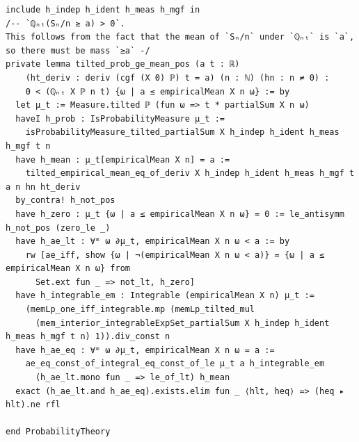\begin{lstlisting}
include h_indep h_ident h_meas h_mgf in
/-- `ℚₙₜ(Sₙ/n ≥ a) > 0`.
This follows from the fact that the mean of `Sₙ/n` under `ℚₙₜ` is `a`, so there must be mass `≥a` -/
private lemma tilted_prob_ge_mean_pos (a t : ℝ)
    (ht_deriv : deriv (cgf (X 0) ℙ) t = a) (n : ℕ) (hn : n ≠ 0) :
    0 < (ℚₙₜ X ℙ n t) {ω | a ≤ empiricalMean X n ω} := by
  let μ_t := Measure.tilted ℙ (fun ω => t * partialSum X n ω)
  haveI h_prob : IsProbabilityMeasure μ_t :=
    isProbabilityMeasure_tilted_partialSum X h_indep h_ident h_meas h_mgf t n
  have h_mean : μ_t[empiricalMean X n] = a :=
    tilted_empirical_mean_eq_of_deriv X h_indep h_ident h_meas h_mgf t a n hn ht_deriv
  by_contra! h_not_pos
  have h_zero : μ_t {ω | a ≤ empiricalMean X n ω} = 0 := le_antisymm h_not_pos (zero_le _)
  have h_ae_lt : ∀ᵐ ω ∂μ_t, empiricalMean X n ω < a := by
    rw [ae_iff, show {ω | ¬(empiricalMean X n ω < a)} = {ω | a ≤ empiricalMean X n ω} from
      Set.ext fun _ => not_lt, h_zero]
  have h_integrable_em : Integrable (empiricalMean X n) μ_t :=
    (memLp_one_iff_integrable.mp (memLp_tilted_mul
      (mem_interior_integrableExpSet_partialSum X h_indep h_ident h_meas h_mgf t n) 1)).div_const n
  have h_ae_eq : ∀ᵐ ω ∂μ_t, empiricalMean X n ω = a :=
    ae_eq_const_of_integral_eq_const_of_le μ_t a h_integrable_em
      (h_ae_lt.mono fun _ => le_of_lt) h_mean
  exact (h_ae_lt.and h_ae_eq).exists.elim fun _ ⟨hlt, heq⟩ => (heq ▸ hlt).ne rfl

end ProbabilityTheory
\end{lstlisting}

\newpage
